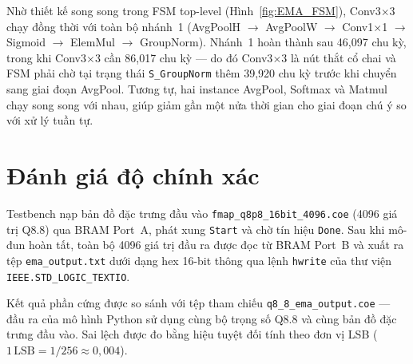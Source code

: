 \documentclass{uetgraduation}
\begin{document}
Nhờ thiết kế song song trong FSM top-level (Hình~\ref{fig:EMA_FSM}), Conv3$\times$3
chạy đồng thời với toàn bộ nhánh~1 (AvgPoolH $\to$ AvgPoolW $\to$ Conv1$\times$1
$\to$ Sigmoid $\to$ ElemMul $\to$ GroupNorm). Nhánh~1 hoàn thành sau 46{,}097 chu kỳ,
trong khi Conv3$\times$3 cần 86{,}017 chu kỳ --- do đó Conv3$\times$3 là nút thắt
cổ chai và FSM phải chờ tại trạng thái \texttt{S\_GroupNorm} thêm
39{,}920 chu kỳ trước khi chuyển sang giai đoạn AvgPool. Tương tự, hai instance
AvgPool, Softmax và Matmul chạy song song với nhau, giúp giảm gần một nửa thời gian
cho giai đoạn chú ý so với xử lý tuần tự.

\section{Đánh giá độ chính xác}

Testbench nạp bản đồ đặc trưng đầu vào \texttt{fmap\_q8p8\_16bit\_4096.coe} (4096 giá
trị Q8.8) qua BRAM Port~A, phát xung \texttt{Start} và chờ tín hiệu \texttt{Done}.
Sau khi mô-đun hoàn tất, toàn bộ 4096 giá trị đầu ra được đọc từ BRAM Port~B và
xuất ra tệp \texttt{ema\_output.txt} dưới dạng hex 16-bit thông qua lệnh
\texttt{hwrite} của thư viện \texttt{IEEE.STD\_LOGIC\_TEXTIO}.

Kết quả phần cứng được so sánh với tệp tham chiếu
\texttt{q8\_8\_ema\_output.coe} --- đầu ra của mô hình Python sử dụng cùng bộ
trọng số Q8.8 và cùng bản đồ đặc trưng đầu vào. Sai lệch được đo bằng hiệu tuyệt đối
tính theo đơn vị LSB ($1\,\text{LSB} = 1/256 \approx 0{,}004$).
\end{document}
